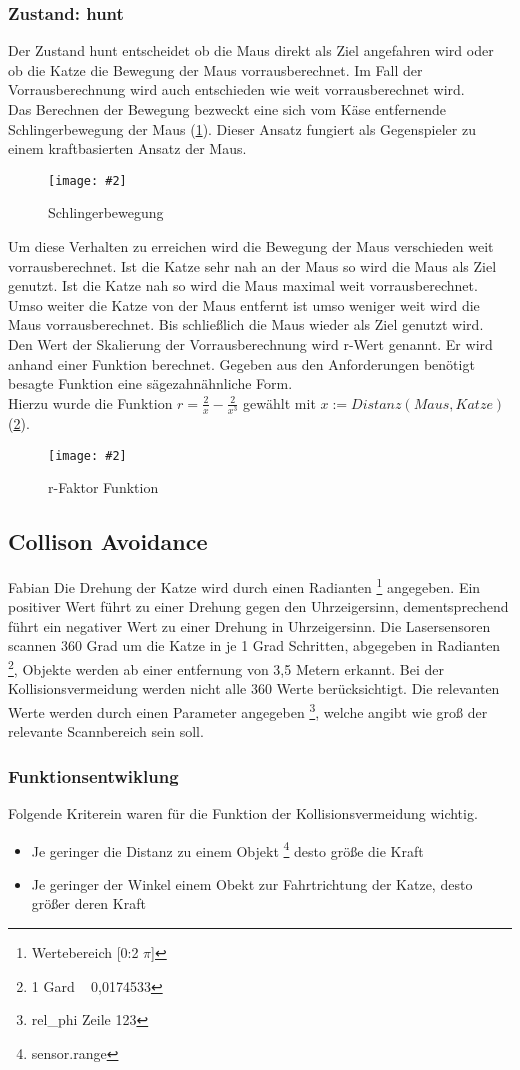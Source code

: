 \documentclass[
a4paper,     %
12pt         %
]{scrartcl}  %
\newcommand{\mygraphics}[3]{
\begin{figure}[!h]
  \begin{center}
    \texttt{[image: \#2]} \\
    \caption{#3}\label{fig:#2}
  \end{center}
\end{figure}

}
\begin{document}
\subsubsection{Zustand: \glqq hunt\grqq{}}
\label{hunt}
Der Zustand \glqq hunt\grqq{} entscheidet ob die Maus direkt als Ziel angefahren wird oder ob die Katze die Bewegung der Maus vorrausberechnet. Im Fall der Vorrausberechnung wird auch entschieden wie weit vorrausberechnet wird.\\
Das Berechnen der Bewegung bezweckt eine sich vom Käse entfernende Schlingerbewegung der Maus (\ref{fig:ziel.png}).
Dieser Ansatz fungiert als Gegenspieler zu einem kraftbasierten Ansatz der Maus.
\mygraphics{0.6\textwidth}{ziel.png}{Schlingerbewegung}
Um diese Verhalten zu erreichen wird die Bewegung der Maus verschieden weit vorrausberechnet.
Ist die Katze sehr nah an der Maus so wird die Maus als Ziel genutzt. Ist die Katze nah so wird die Maus maximal weit vorrausberechnet. Umso weiter die Katze von der Maus entfernt ist umso weniger weit wird die Maus vorrausberechnet.
Bis schließlich die Maus wieder als Ziel genutzt wird.\\
\clearpage
Den Wert der Skalierung der Vorrausberechnung wird r-Wert genannt. Er wird anhand einer Funktion berechnet.
Gegeben aus den Anforderungen benötigt besagte Funktion eine sägezahnähnliche Form.\\Hierzu wurde die Funktion $r= \frac{2}{x} - \frac{2}{x^3}$
gewählt mit $x := Distanz(Maus,Katze)$  (\ref{fig:huntFunction.png}).
\mygraphics{0.9\textwidth}{huntFunction.png}{r-Faktor Funktion}
\clearpage
\subsection{Collison Avoidance}
Fabian
Die Drehung der Katze wird durch einen Radianten \footnote {Wertebereich [0:2 $\pi$]} angegeben. Ein positiver Wert führt zu einer Drehung gegen den Uhrzeigersinn, dementsprechend führt ein negativer Wert zu einer Drehung in Uhrzeigersinn.
Die Lasersensoren scannen 360 Grad um die Katze in je 1 Grad Schritten, abgegeben in Radianten \footnote {1 Gard ~ 0,0174533}, Objekte werden ab einer entfernung von 3,5 Metern erkannt.
Bei der Kollisionsvermeidung werden nicht alle 360 Werte berücksichtigt. Die relevanten Werte werden durch einen Parameter angegeben \footnote {rel\_phi Zeile 123}, welche angibt wie groß der relevante Scannbereich sein soll.

\subsubsection{Funktionsentwiklung}
Folgende Kriterein waren für die Funktion der Kollisionsvermeidung wichtig.
\begin{itemize}
\item Je geringer die Distanz zu einem Objekt \footnote {sensor.range} desto größe die Kraft
\item Je geringer der Winkel einem Obekt zur Fahrtrichtung der Katze, desto größer deren Kraft
\end{itemize}
\end{document}
